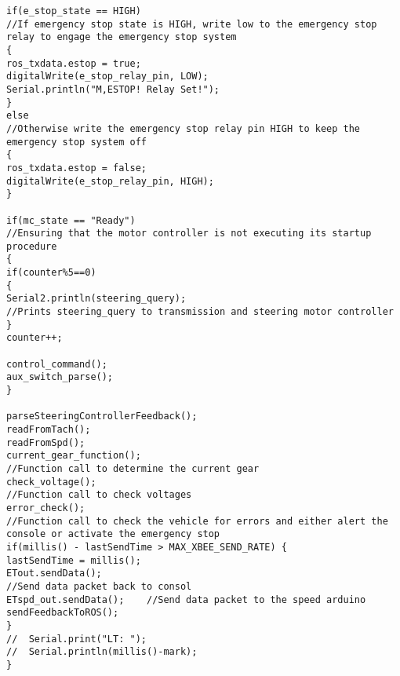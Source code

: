 \begin{lstlisting}[breaklines=true,basicstyle=\tiny]
if(e_stop_state == HIGH)                                                                      //If emergency stop state is HIGH, write low to the emergency stop relay to engage the emergency stop system
{
ros_txdata.estop = true;
digitalWrite(e_stop_relay_pin, LOW);
Serial.println("M,ESTOP! Relay Set!");
}
else                                                                                          //Otherwise write the emergency stop relay pin HIGH to keep the emergency stop system off
{
ros_txdata.estop = false;
digitalWrite(e_stop_relay_pin, HIGH);
}

if(mc_state == "Ready")                                                                       //Ensuring that the motor controller is not executing its startup procedure
{
if(counter%5==0)
{
Serial2.println(steering_query);                                                          //Prints steering_query to transmission and steering motor controller
}
counter++;

control_command();
aux_switch_parse();
}

parseSteeringControllerFeedback();
readFromTach(); 
readFromSpd();
current_gear_function();                                                                      //Function call to determine the current gear
check_voltage();                                                                              //Function call to check voltages
error_check();                                                                                //Function call to check the vehicle for errors and either alert the console or activate the emergency stop
if(millis() - lastSendTime > MAX_XBEE_SEND_RATE) {
lastSendTime = millis();
ETout.sendData();                                                                             //Send data packet back to consol
ETspd_out.sendData();    //Send data packet to the speed arduino
sendFeedbackToROS();
}
//  Serial.print("LT: ");
//  Serial.println(millis()-mark);
}


\end{lstlisting}

